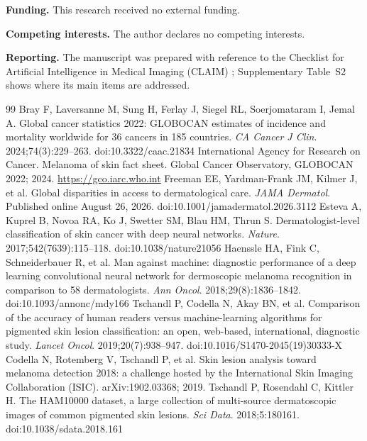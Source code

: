 \documentclass[11pt,a4paper]{article}
\begin{document}
\textbf{Funding.} This research received no external funding.

\textbf{Competing interests.} The author declares no competing interests.

\textbf{Reporting.} The manuscript was prepared with reference to the Checklist for Artificial Intelligence in Medical Imaging (CLAIM) \cite{mongan2020}; Supplementary Table~S2 shows where its main items are addressed.

\normalsize
\renewcommand{\refname}{References}
\begin{thebibliography}{99}
\small
\setlength{\itemsep}{0.15em}
 Bray F, Laversanne M, Sung H, Ferlay J, Siegel RL, Soerjomataram I, Jemal A. Global cancer statistics 2022: GLOBOCAN estimates of incidence and mortality worldwide for 36 cancers in 185 countries. \emph{CA Cancer J Clin}. 2024;74(3):229--263. doi:10.3322/caac.21834
 International Agency for Research on Cancer. Melanoma of skin fact sheet. Global Cancer Observatory, GLOBOCAN 2022; 2024. \url{https://gco.iarc.who.int}
 Freeman EE, Yardman-Frank JM, Kilmer J, et al. Global disparities in access to dermatological care. \emph{JAMA Dermatol}. Published online August 26, 2026. doi:10.1001/jamadermatol.2026.3112
 Esteva A, Kuprel B, Novoa RA, Ko J, Swetter SM, Blau HM, Thrun S. Dermatologist-level classification of skin cancer with deep neural networks. \emph{Nature}. 2017;542(7639):115--118. doi:10.1038/nature21056
 Haenssle HA, Fink C, Schneiderbauer R, et al. Man against machine: diagnostic performance of a deep learning convolutional neural network for dermoscopic melanoma recognition in comparison to 58 dermatologists. \emph{Ann Oncol}. 2018;29(8):1836--1842. doi:10.1093/annonc/mdy166
 Tschandl P, Codella N, Akay BN, et al. Comparison of the accuracy of human readers versus machine-learning algorithms for pigmented skin lesion classification: an open, web-based, international, diagnostic study. \emph{Lancet Oncol}. 2019;20(7):938--947. doi:10.1016/S1470-2045(19)30333-X
 Codella N, Rotemberg V, Tschandl P, et al. Skin lesion analysis toward melanoma detection 2018: a challenge hosted by the International Skin Imaging Collaboration (ISIC). arXiv:1902.03368; 2019.
 Tschandl P, Rosendahl C, Kittler H. The HAM10000 dataset, a large collection of multi-source dermatoscopic images of common pigmented skin lesions. \emph{Sci Data}. 2018;5:180161. doi:10.1038/sdata.2018.161

\end{thebibliography}
\end{document}
